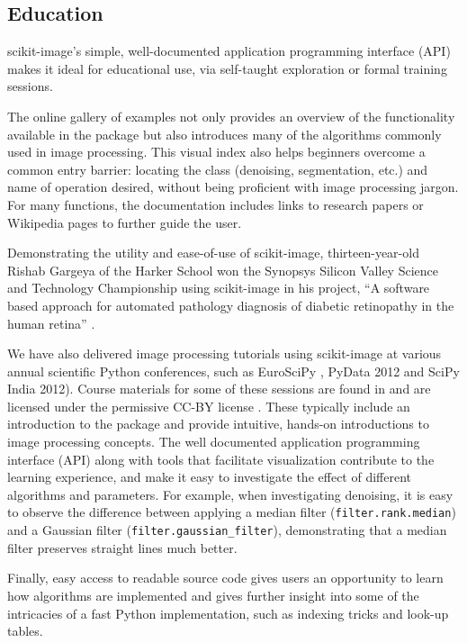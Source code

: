 
  \subsection*{Education}
    \label{education}

    scikit-image's simple, well-documented application programming interface (API) makes it ideal for educational use, via self-taught exploration or formal training sessions.

    The online gallery of examples not only provides an overview of the functionality available in the package but also introduces many of the algorithms commonly used in image processing. This visual index also helps beginners overcome a common entry barrier: locating the class (denoising, segmentation, etc.) and name of operation desired, without being proficient with image processing jargon.  For many functions, the documentation includes links to research papers or Wikipedia pages to further guide the user.

    Demonstrating the utility and ease-of-use of scikit-image, thirteen-year-old Rishab Gargeya of the Harker School won the Synopsys Silicon Valley Science and Technology Championship using scikit-image in his project, ``A software based approach for automated pathology diagnosis of diabetic retinopathy in the human retina'' \citep{sciencefair}.

    We have also delivered image processing tutorials using scikit-image at various annual scientific Python conferences, such as EuroSciPy \citep{euroscipy2013}, PyData 2012 \citep{pydata2012} and SciPy India 2012). Course materials for some of these sessions are found in \cite{scipylecturenotes} and are licensed under the permissive CC-BY license \citep{cc-by}. These typically include an introduction to the package and provide intuitive, hands-on introductions to image processing concepts. The well documented application programming interface (API) along with tools that facilitate visualization contribute to the learning experience, and make it easy to investigate the effect of different algorithms and parameters. For example, when investigating denoising, it is easy to observe the difference between applying a median filter (\texttt{filter.rank.median}) and a Gaussian filter (\texttt{filter.gaussian\_filter}), demonstrating that a median filter preserves straight lines much better.

    Finally, easy access to readable source code gives users an opportunity to learn how algorithms are implemented and gives further insight into some of the intricacies of a fast Python implementation, such as indexing tricks and look-up tables.
